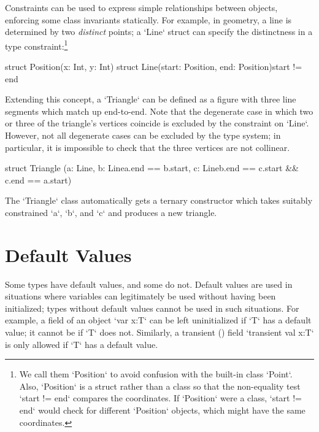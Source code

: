 Constraints can be used to express simple relationships between objects,
enforcing some class invariants statically.  For example, in geometry, a line
is determined by two {\em distinct} points; a \xcd`Line` struct can specify the
distinctness in a type constraint:\footnote{We call them
\xcd`Position` to avoid confusion with the built-in class \xcd`Point`. 
Also, \xcd`Position` is a struct rather than a class so that the non-equality
test \xcd`start != end` compares the coordinates.  If \xcd`Position` were a
class, \xcd`start != end` would check for different \xcd`Position` objects,
which might have the same coordinates.
}


\begin{xten}
struct Position(x: Int, y: Int) {}
struct Line(start: Position, end: Position){start != end} {}
\end{xten}


Extending this concept, a \xcd`Triangle` can be defined as a figure with three
line segments which match up end-to-end.  Note that the degenerate case in
which two or three of the triangle's vertices coincide is excluded by the
constraint on \xcd`Line`.  However, not all degenerate cases can be excluded
by the type system; in particular, it is impossible to check that the three
vertices are not collinear. 

% 
\begin{xten}
struct Triangle 
 (a: Line, 
  b: Line{a.end == b.start}, 
  c: Line{b.end == c.start && c.end == a.start})  
 {}
\end{xten}
%

The \xcd`Triangle` class automatically gets a ternary constructor which takes
suitably constrained \xcd`a`, \xcd`b`, and \xcd`c` and produces a new
triangle. 

\section{Default Values}
\label{DefaultValues}

Some types have default values, and some do not. Default values are used in
situations where variables can legitimately be used without having been
initialized; types without default values cannot be used in such situations.
For example, a field of an object \xcd`var x:T` can be left uninitialized if
\xcd`T` has a default value; it cannot be if \xcd`T` does not. Similarly, a
transient () field \xcd`transient val x:T` is only
allowed if \xcd`T` has a default value.

